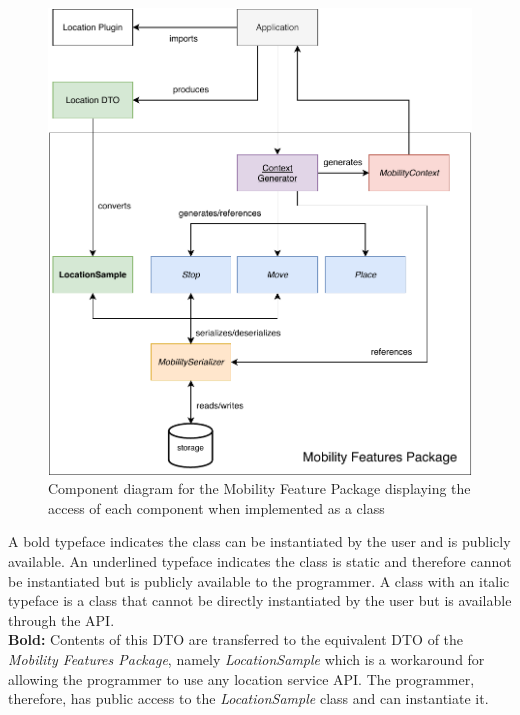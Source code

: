  \begin{figure}[h]
    \centering
    \includegraphics[width=\textwidth]{images/diagrams/api-diagram.pdf}
    \caption{Component diagram for the Mobility Feature Package displaying the access of each component when implemented as a class}
    \label{fig:component-diagram}
\end{figure}
 
A bold typeface indicates the class can be instantiated by the user and is publicly available. An underlined typeface indicates the class is static and therefore cannot be instantiated but is publicly available to the programmer. A class with an italic typeface is a class that cannot be directly instantiated by the user but is available through the API. \\
 
\textbf{Bold:} Contents of this DTO are transferred to the equivalent DTO of the \textit{Mobility Features Package}, namely \textit{LocationSample} which is a workaround for allowing the programmer to use any location service API. The programmer, therefore, has public access to the \textit{LocationSample} class and can instantiate it.\\


